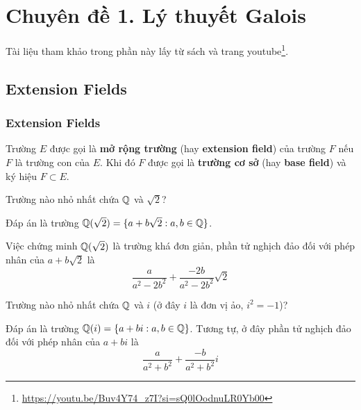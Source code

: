 \chapter*{Chuyên đề 1. Lý thuyết Galois}

Tài liệu tham khảo trong phần này lấy từ sách \cite{Judson2012} và trang youtube\footnote{\url{https://youtu.be/Buv4Y74_z7I?si=sQ0lOodnuLR0Yb00}}.

\section{Extension Fields}

\subsection*{Extension Fields}

\begin{definition}
    Trường $E$ được gọi là \textbf{mở rộng trường} (hay \textbf{extension field}) của trường $F$ nếu $F$ là trường con của $E$. Khi đó $F$ được gọi là \textbf{trường cơ sở} (hay \textbf{base field}) và ký hiệu $F \subset E$.
\end{definition}

\begin{example}
    Trường nào nhỏ nhất chứa $\mathbb{Q}$ và $\sqrt{2}$?

    Đáp án là trường $\mathbb{Q}(\sqrt{2}) = \{ a + b \sqrt{2} : a, b \in \mathbb{Q} \}$.

    Việc chứng minh $\mathbb{Q}(\sqrt{2})$ là trường khá đơn giản, phần tử nghịch đảo đối với phép nhân của $a + b \sqrt{2}$ là
    \begin{equation*}
        \frac{a}{a^2 - 2 b^2} + \frac{-2b}{a^2 - 2 b^2} \sqrt{2}
    \end{equation*}
\end{example}

\begin{example}
    Trường nào nhỏ nhất chứa $\mathbb{Q}$ và $i$ (ở đây $i$ là đơn vị ảo, $i^2 = -1$)?

    Đáp án là trường $\mathbb{Q}(i) = \{ a + b i : a, b \in \mathbb{Q} \}$. Tương tự, ở đây phần tử nghịch đảo đối với phép nhân của $a + b i$ là
    \begin{equation*}
        \frac{a}{a^2 + b^2} + \frac{-b}{a^2 + b^2} i
    \end{equation*}
\end{example}

